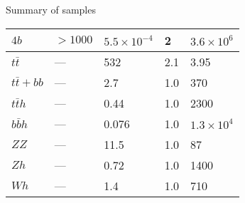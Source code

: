 \documentclass[10pt, aspectratio=169]{beamer}
\begin{document}
\begin{frame}{ Summary of samples }
\begin{table}[]
\begin{tabular}{lllll}
$4b$             & $>1000$                  & $5.5\times 10^{-4}$               & 2                                                & $3.6 \times 10^6$                          \\
\midrule
$t\bar{t}$       & ---                      & 532                               & 2.1                                              & 3.95                                       \\
$t\bar{t}+bb$    & ---                      & 2.7                               & 1.0    
    & 370                                       \\
    $t\bar{t}h$      & ---                      & 0.44                              & 1.0                                              & 2300                                       \\
    $b\bar{b}h$      & ---                      & 0.076                             & 1.0                                              & $1.3\times 10^4$                           \\
    \midrule
    $ZZ$             & ---                      & 11.5                              & 1.0                                              & 87                                       \\
    $Zh$             & ---                      & 0.72                              & 1.0                                              & 1400                                       \\
    $Wh$             & ---                      & 1.4                               & 1.0                                              & 710                                       \\
    \bottomrule
    \end{tabular}
    \end{table}

\end{frame}
\end{document}
